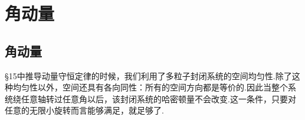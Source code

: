 %
\chapter{角动量}

\section{角动量}

§15中推导动量守恒定律的时候，我们利用了多粒子封闭系统的空间均匀性.除了这种均匀性以外，空间还具有各向同性：所有的空间方向都是等价的.因此当整个系统绕任意轴转过任意角以后，该封闭系统的哈密顿量不会改变.这一条件，只要对任意的无限小旋转而言能够满足，就足够了.

